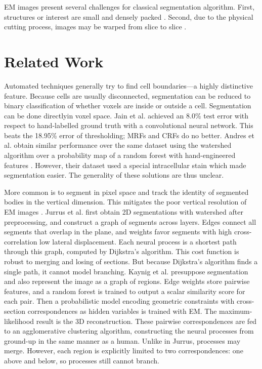 \documentclass[english]{article}
\newcommand{\+}[1]{\ensuremath{\boldsymbol{\mathrm{#1}}}}
\begin{document}
EM images present several challenges for classical segmentation algorithm. First, structures or interest are small and densely packed \cite{Jain2007}. Second, due to the physical cutting process, images may be warped from slice to slice \cite{Koshevoy2006}.

\section{Related Work}
Automated techniques generally try to find cell boundaries---a highly distinctive feature. Because cells are usually disconnected, segmentation can be reduced to binary classification of whether voxels are inside or outside a cell. Segmentation can be done directlyin voxel space. Jain et al. \cite{Jain2007} achieved an 8.0\% test error with respect to hand-labelled ground truth with a convolutional neural network. This beats the 18.95\% error of thresholding; MRFs and CRFs do no better. Andres et al. obtain similar performance over the same dataset using the watershed algorithm over a probability map of a random forest with hand-engineered features \cite{Andres2008}. However, their dataset used a special intracellular stain which made segmentation easier. The generality of these solutions are thus unclear.

More common is to segment in pixel space and track the identity of segmented bodies in the vertical dimension. This mitigates the poor vertical resolution of EM images \cite{Kaynig2010, Briggman2006}. Jurrus et al. \cite{Jurrus2008} first obtain 2D segmentations with watershed after preprocessing, and construct a graph of segments across layers. Edges connect all segments that overlap in the plane, and weights favor segments with high cross-correlation low lateral displacement. Each neural process is a shortest path through this graph, computed by Dijkstra's algorithm. This cost function is robust to merging and losing of sections. But because Dijkstra's algorithm finds a single path, it cannot model branching. Kaynig et al. \cite{Kaynig2010a} presuppose segmentation and also represent the image as a graph of regions. Edge weights store pairwise features, and a random forest is trained to output a scalar similarity score for each pair. Then a probabilistic model encoding geometric constraints with cross-section correspondences as hidden variables is trained with EM. The maximum-likelihood result is the 3D reconstruction. These pairwise correspondences are fed to an agglomerative clustering algorithm, constructing the neural processes from ground-up in the same manner as a human. Unlike in Jurrus, processes may merge. However, each region is explicitly limited to two correspondences: one above and below, so processes still cannot branch.
\end{document}
